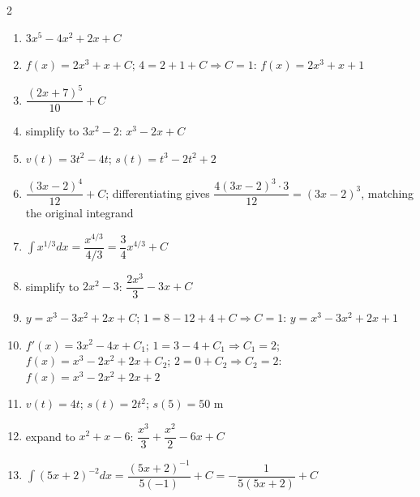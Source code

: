 \documentclass[11pt]{article}
\begin{document}
\begin{keybox}
\begin{multicols}{2}
\small
\begin{enumerate}[leftmargin=*,itemsep=3pt]
  \item $3x^5-4x^2+2x+C$
  \item $f(x)=2x^3+x+C$; $4=2+1+C\Rightarrow C=1$: $f(x)=2x^3+x+1$
  \item $\dfrac{(2x+7)^5}{10}+C$
  \item simplify to $3x^2-2$: $x^3-2x+C$
  \item $v(t)=3t^2-4t$; $s(t)=t^3-2t^2+2$
  \item $\dfrac{(3x-2)^4}{12}+C$; differentiating gives $\dfrac{4(3x-2)^3\cdot3}{12}=(3x-2)^3$, matching the original integrand
  \item $\int x^{1/3}dx=\dfrac{x^{4/3}}{4/3}=\dfrac34x^{4/3}+C$
  \item simplify to $2x^2-3$: $\dfrac{2x^3}3-3x+C$
  \item $y=x^3-3x^2+2x+C$; $1=8-12+4+C\Rightarrow C=1$: $y=x^3-3x^2+2x+1$
  \item $f'(x)=3x^2-4x+C_1$; $1=3-4+C_1\Rightarrow C_1=2$; $f(x)=x^3-2x^2+2x+C_2$; $2=0+C_2\Rightarrow C_2=2$: $f(x)=x^3-2x^2+2x+2$
  \item $v(t)=4t$; $s(t)=2t^2$; $s(5)=50$ m
  \item expand to $x^2+x-6$: $\dfrac{x^3}3+\dfrac{x^2}2-6x+C$
  \item $\int(5x+2)^{-2}dx=\dfrac{(5x+2)^{-1}}{5(-1)}+C=-\dfrac1{5(5x+2)}+C$
\end{enumerate}
\end{multicols}
\end{keybox}
\end{document}
